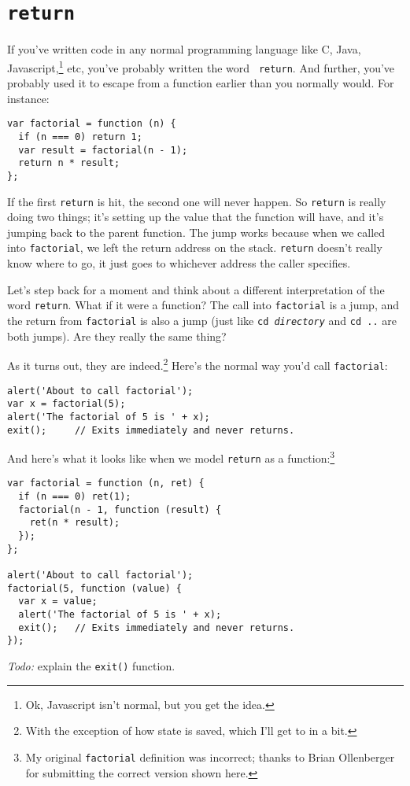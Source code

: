\documentclass{article}
\begin{document}
\section{{\tt return}}
  If you've written code in any normal programming language like C, Java, Javascript,\footnote{Ok, Javascript isn't normal, but you get the idea.} etc, you've probably written the word {\tt
  return}. And further, you've probably used it to escape from a function earlier than you normally would. For instance:

\begin{verbatim}
var factorial = function (n) {
  if (n === 0) return 1;
  var result = factorial(n - 1);
  return n * result;
};
\end{verbatim}

  \noindent If the first {\tt return} is hit, the second one will never happen. So {\tt return} is really doing two things; it's setting up the value that the function will have, and it's
  jumping back to the parent function. The jump works because when we called into {\tt factorial}, we left the return address on the stack. {\tt return} doesn't really know where to go, it
  just goes to whichever address the caller specifies.

  Let's step back for a moment and think about a different interpretation of the word {\tt return}. What if it were a function? The call into {\tt factorial} is a jump, and the return from
  {\tt factorial} is also a jump (just like {\tt cd {\em directory}} and {\tt cd ..} are both jumps). Are they really the same thing?

  As it turns out, they are indeed.\footnote{With the exception of how state is saved, which I'll get to in a bit.} Here's the normal way you'd call {\tt factorial}:

\begin{verbatim}
alert('About to call factorial');
var x = factorial(5);
alert('The factorial of 5 is ' + x);
exit();     // Exits immediately and never returns.
\end{verbatim}

  \noindent And here's what it looks like when we model {\tt return} as a function:\footnote{My original {\tt factorial} definition was incorrect; thanks to Brian Ollenberger for submitting
  the correct version shown here.}

\begin{verbatim}
var factorial = function (n, ret) {
  if (n === 0) ret(1);
  factorial(n - 1, function (result) {
    ret(n * result);
  });
};

alert('About to call factorial');
factorial(5, function (value) {
  var x = value;
  alert('The factorial of 5 is ' + x);
  exit();   // Exits immediately and never returns.
});
\end{verbatim}

  {\em Todo:} explain the {\tt exit()} function.
\end{document}
